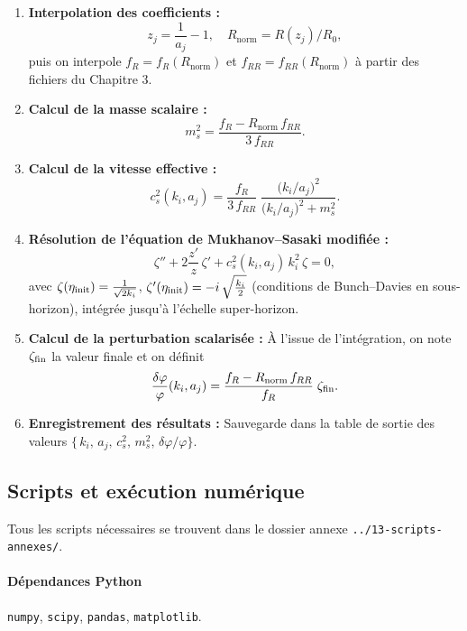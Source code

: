 \begin{enumerate}
  \item \textbf{Interpolation des coefficients :}
    \[
      z_{j} = \frac{1}{a_{j}} - 1,
      \quad
      R_{\mathrm{norm}} = R(z_{j})/R_{0},
    \]
    puis on interpole \(f_{R}=f_{R}(R_{\mathrm{norm}})\) et \(f_{RR}=f_{RR}(R_{\mathrm{norm}})\) à partir des fichiers du Chapitre 3.

  \item \textbf{Calcul de la masse scalaire :}
    \[
      m_{s}^{2}
      = \frac{f_{R} - R_{\mathrm{norm}}\,f_{RR}}{3\,f_{RR}}.
    \]

  \item \textbf{Calcul de la vitesse effective :}
    \[
      c_{s}^{2}(k_{i},a_{j})
      = \frac{f_{R}}{3\,f_{RR}}
        \;\frac{\bigl(k_{i}/a_{j}\bigr)^{2}}{\bigl(k_{i}/a_{j}\bigr)^{2} + m_{s}^{2}}.
    \]

  \item \textbf{Résolution de l’équation de Mukhanov–Sasaki modifiée :}
    \[
      \zeta'' + 2\frac{z'}{z}\,\zeta' + c_{s}^{2}(k_{i},a_{j})\,k_{i}^{2}\,\zeta = 0,
    \]
    avec
    \(\zeta(\eta_{\rm init}) = \frac{1}{\sqrt{2k_{i}}}\),
    \(\zeta'(\eta_{\rm init}) = -i\,\sqrt{\tfrac{k_{i}}{2}}\)
    (conditions de Bunch–Davies en sous-horizon),
    intégrée jusqu’à l’échelle super-horizon.

  \item \textbf{Calcul de la perturbation scalarisée :}
    À l’issue de l’intégration, on note \(\zeta_{\rm fin}\) la valeur finale et on définit
    \[
      \frac{\delta\varphi}{\varphi}(k_{i},a_{j})
      = \frac{f_{R} - R_{\mathrm{norm}}\,f_{RR}}{f_{R}}\;\zeta_{\rm fin}.
    \]

  \item \textbf{Enregistrement des résultats :}
    Sauvegarde dans la table de sortie des valeurs
    \(\{\,k_{i},\,a_{j},\,c_{s}^{2},\,m_{s}^{2},\,\delta\varphi/\varphi\}\).
\end{enumerate}

\subsection{Scripts et exécution numérique}
Tous les scripts nécessaires se trouvent dans le dossier annexe \texttt{../13-scripts-annexes/}.

\paragraph{Dépendances Python}
\texttt{numpy}, \texttt{scipy}, \texttt{pandas}, \texttt{matplotlib}.

